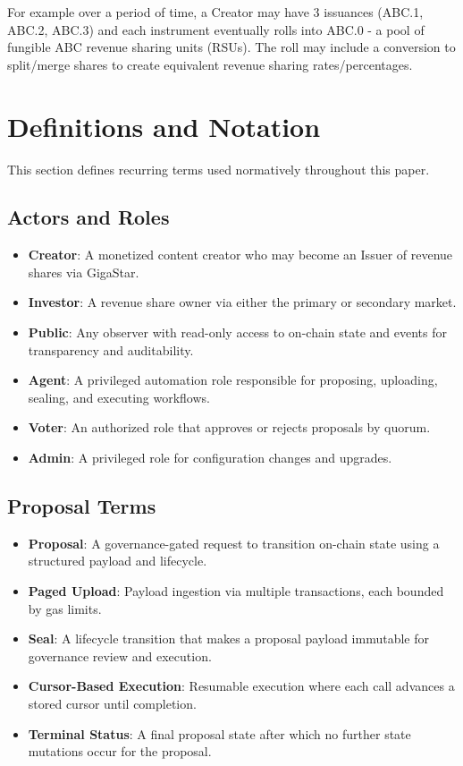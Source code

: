 \documentclass[10pt]{article}
\begin{document}
For example over a period of time, a Creator may have 3 issuances (ABC.1, ABC.2, ABC.3) and each instrument eventually rolls into ABC.0 - a pool of fungible ABC revenue sharing units (RSUs). The roll may include a conversion to split/merge shares to create equivalent revenue sharing rates/percentages.

\section{Definitions and Notation}

This section defines recurring terms used normatively throughout this paper.

\subsection{Actors and Roles}
\begin{itemize}
    \item \textbf{Creator}: A monetized content creator who may become an Issuer of revenue shares via GigaStar.
    \item \textbf{Investor}: A revenue share owner via either the primary or secondary market.
    \item \textbf{Public}: Any observer with read-only access to on-chain state and events for transparency and auditability.
    \item \textbf{Agent}: A privileged automation role responsible for proposing, uploading, sealing, and executing workflows.
    \item \textbf{Voter}: An authorized role that approves or rejects proposals by quorum.
    \item \textbf{Admin}: A privileged role for configuration changes and upgrades.
\end{itemize}

\subsection{Proposal Terms}
\begin{itemize}
    \item \textbf{Proposal}: A governance-gated request to transition on-chain state using a structured payload and lifecycle.
    \item \textbf{Paged Upload}: Payload ingestion via multiple transactions, each bounded by gas limits.
    \item \textbf{Seal}: A lifecycle transition that makes a proposal payload immutable for governance review and execution.
    \item \textbf{Cursor-Based Execution}: Resumable execution where each call advances a stored cursor until completion.
    \item \textbf{Terminal Status}: A final proposal state after which no further state mutations occur for the proposal.
\end{itemize}
\end{document}
